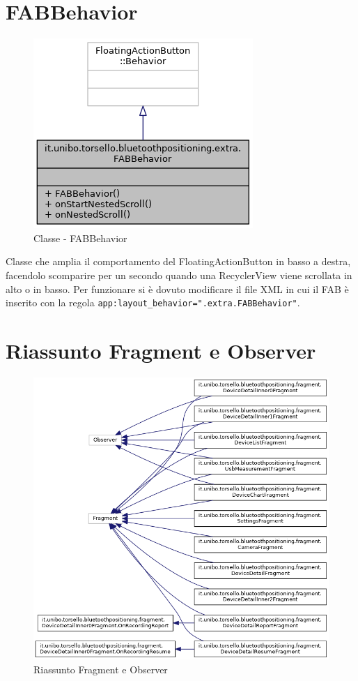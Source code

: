 \section{FABBehavior}
\begin{figure}[ph]
	\centering
	\includegraphics[width=0.6\linewidth]{img/uml/class/classit_1_1unibo_1_1torsello_1_1bluetoothpositioning_1_1extra_1_1FABBehavior__inherit__graph.png}
	\caption{Classe - FABBehavior}
\end{figure}

Classe che amplia il comportamento del FloatingActionButton in basso a destra, facendolo scomparire per un secondo quando una RecyclerView viene scrollata in alto o in basso.
Per funzionare si è dovuto modificare il file XML in cui il FAB è inserito con la regola \texttt{app:layout\_behavior=".extra.FABBehavior"}.

\newpage
\section{Riassunto Fragment e Observer}
\begin{figure}[ph]
	\centering
	\includegraphics[width=1.25\linewidth]{img/uml/inherit_graph/inherit_graph_13.png}
	\caption{Riassunto Fragment e Observer}
\end{figure}